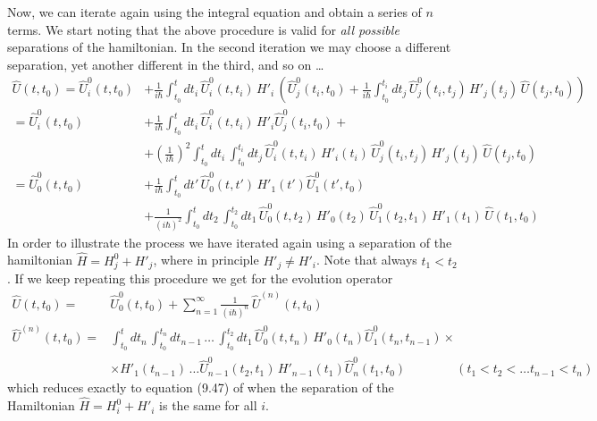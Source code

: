 Now, we can iterate again using the integral equation and obtain a series of $n$ terms. We start noting that the above procedure is valid for \emph{all possible} separations of the hamiltonian. In the second iteration we may choose a different separation, yet another different in the third, and so on \dots
\begin{align*}
  \hat{U}(t,t_{0}) = \hat{U}^{0}_{i}(t,t_{0}) &+ \frac{1}{i\hbar} \int_{t_{0}}^{t}  dt_{i} \, \hat{U}^{0}_{i}(t,t_{i})\, H'_{i} \, \left( \hat{U}^{0}_{j}(t_{i},t_{0}) + \frac{1}{i\hbar} \int_{t_{0}}^{t_{i}} dt_{j} \, \hat{U}^{0}_{j}(t_{i},t_{j})\, H'_{j}(t_{j}) \, \hat{U}(t_{j},t_{0}) \right)  \\
 = \hat{U}^{0}_{i}(t,t_{0}) & + \frac{1}{i\hbar} \int_{t_{0}}^{t}  dt_{i} \, \hat{U}^{0}_{i}(t,t_{i})\, H'_{i}  \hat{U}^{0}_{j}(t_{i},t_{0}) + \\ 
 &+  \left( \frac{1}{i\hbar} \right)^{2} \int_{t_{0}}^{t} dt_{i} \, \int_{t_{0}}^{t_{i}}  dt_{j} \, \hat{U}^{0}_{i}(t,t_{i})\, H'_{i}(t_{i}) \, \hat{U}^{0}_{j}(t_{i},t_{j})\, H'_{j}(t_{j}) \, \hat{U}(t_{j},t_{0}) \\
 = \hat{U}^{0}_{0}(t,t_{0}) &+ \frac{1}{i\hbar} \int_{t_{0}}^{t}  dt' \, \hat{U}^{0}_{0}(t,t')\, H'_{1}(t')  \hat{U}^{0}_{1}(t',t_{0}) \\ 
&+  \frac{1}{(i\hbar)^{2}}  \int_{t_{0}}^{t} dt_{2} \, \int_{t_{0}}^{t_{2}} dt_{1} \, \hat{U}^{0}_{0}(t,t_{2})\, H'_{0}(t_{2}) \, \hat{U}^{0}_{1}(t_{2},t_{1})\, H'_{1}(t_{1}) \, \hat{U}(t_{1},t_{0})
\end{align*}
In order to illustrate the process we have iterated again using a separation of the hamiltonian $\hat{H}=H^{0}_{j} + H'_{j}$, where in principle $H'_{j} \neq H'_{i}$. Note that always $t_{1} < t_{2}$. If we keep repeating this procedure we get for the evolution operator
\begin{subequations}
  \begin{align}
    \label{Q:td-serie-evolu-opera}
    \hat{U}(t,t_{0}) =& \hat{U}^{0}_{0}(t,t_{0}) + \sum_{n=1}^{\infty} \frac{1}{(i \hbar)^{n}} \,\hat{U}^{(n)}(t,t_{0})  \\
    \hat{U}^{(n)}(t,t_{0}) =& \int_{t_{0}}^{t} dt_{n}\,\int_{t_{0}}^{t_{n}} dt_{n-1}\,\dots\,\int_{t_{0}}^{t_{2}} dt_{1}\, \hat{U}^{0}_{0}(t,t_{n})\, H'_{0}(t_{n}) \hat{U}^{0}_{1}(t_{n},t_{n-1}) \times \\
    &\times H'_{1}(t_{n-1}) \, \dots {\hat{U}^{0}_{n-1}(t_{2},t_{1})\, H'_{n-1}(t_{1})}
    \hat{U}^{0}_{n}(t_{1},t_{0}) \qquad \qquad \left( t_{1} < t_{2} < \dots t_{n-1} <
      t_{n} \right) \nonumber
  \end{align}
\end{subequations}
which reduces exactly to equation (9.47) of \citet{Tannor2007_ITQ} when the separation of the Hamiltonian $\hat{H}= H^{0}_{i} + H'_{i}$ is the same for all $i$.

